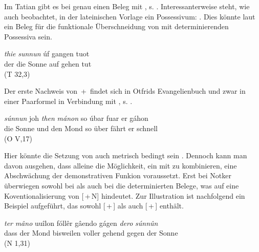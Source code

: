 Im Tatian gibt es bei  genau einen Beleg mit , s. . Interessanterweise steht, wie auch \textcite[20]{Graf1905} beobachtet, in der lateinischen Vorlage ein Possessivum: . Dies könnte laut \textcite[216]{Oubouzar1989} ein Beleg für die funktionale Überschneidung von  mit determinierenden Possessiva sein.

%

\begin{exe}
\ex \label{ex:T6760}  {\textit{thie}} {\textit{sunnun}} {úf} {gangen} {tuot} \\
{der} {die} {Sonne} {auf} {gehen} {tut}  \\
\glt   {} (T 32,3)
\end{exe}

Der erste Nachweis von \,+\, findet sich in Otfrids Evangelienbuch und zwar in einer Paarformel in Verbindung mit , s. .
%
\begin{exe}
\ex \label{ex:O68453}  {\textit{súnnun}} {joh} {\textit{then}} {\textit{mánon}} {so} {úbar} {fuar} {er} {gáhon}  \\
{die} {Sonne} {und} {den} {Mond} {so} {über} {fährt} {er} {schnell} \\
\glt   {} (O V,17)
\end{exe}
\noindent 
Hier könnte die Setzung von  auch metrisch bedingt sein \parencite[20]{Graf1905}. Dennoch kann man davon ausgehen, dass alleine die Möglichkeit, ein  mit  zu kombinieren, eine Abschwächung der demonstrativen Funkion voraussetzt. Erst bei Notker überwiegen sowohl bei  als auch bei  die determinierten Belege, was auf eine  Koventionalisierung von [\,+\,N] hindeutet. Zur Illustration ist nachfolgend ein Beispiel aufgeführt, das sowohl [\,+\,] als auch [\,+\,] enthält. 
%

\begin{exe}
\ex \label{ex:N8884}  {\textit{ter}} {\textit{mâno}} {uuîlon} {fóllêr} {gâendo} {gágen} {\textit{dero}} {\textit{súnnûn}}  \\
{dass} {der} {Mond} {bisweilen} {voller} {gehend} {gegen} {der} {Sonne}\\
\glt   {} (N 1,31)
\end{exe}

